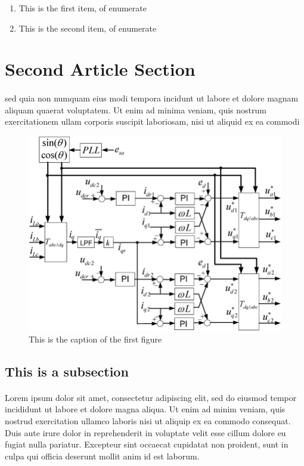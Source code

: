\documentclass[a4paper]{article}
\begin{document}
\begin{enumerate}
\item This is the first item, of enumerate
\item This is the second item, of enumerate
\end{enumerate}

\newpage


\section{Second Article Section}
\paragraph{}
sed quia non numquam eius modi tempora incidunt ut labore et dolore magnam aliquam quaerat voluptatem. Ut enim ad minima
veniam, quis nostrum exercitationem ullam corporis suscipit laboriosam, nisi ut aliquid ex ea commodi

\begin{figure}[b!]
\centering
\includegraphics[scale=0.3]{assets/figures/figure_1.png}
\caption{This is the caption of the first figure}
\label{fig:figure 1}
\end{figure}

\subsection{This is a subsection}
\paragraph{}
Lorem ipsum dolor sit amet, consectetur adipiscing elit, sed do eiusmod tempor incididunt ut labore et dolore magna aliqua.
Ut enim ad minim veniam, quis nostrud exercitation ullamco laboris nisi ut aliquip ex ea commodo consequat. Duis aute irure
dolor in reprehenderit in voluptate velit esse cillum dolore eu fugiat nulla pariatur. Excepteur sint occaecat cupidatat
non proident, sunt in culpa qui officia deserunt mollit anim id est laborum.
\end{document}
